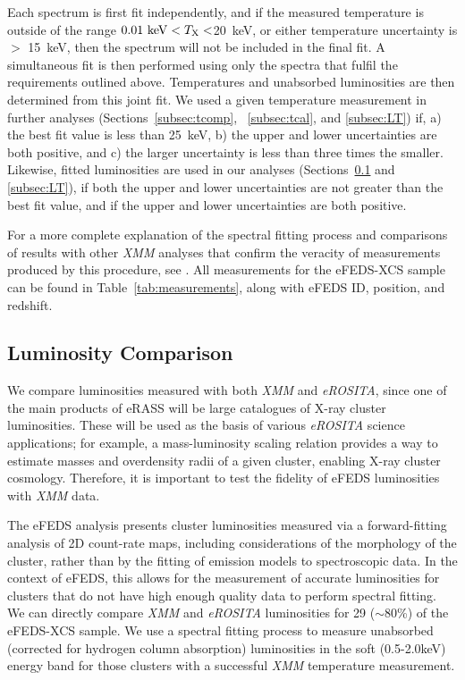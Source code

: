 \documentclass[fleqn,usenatbib]{mnras}
\begin{document}
Each spectrum is first fit independently, and if the measured temperature is outside of the range $0.01~{\rm keV} < T_{\rm{X}} < $20~keV, or either temperature uncertainty is $>$ 15~keV, then the spectrum will not be included in the final fit. A simultaneous fit is then performed using only the spectra that fulfil the requirements outlined above. Temperatures and unabsorbed luminosities are then determined from this joint fit. We used a given temperature measurement in further analyses (Sections~\ref{subsec:tcomp},  ~\ref{subsec:tcal}, and \ref{subsec:LT}) if, a) the best fit value is less than 25~keV, b) the upper and lower uncertainties are both positive, and c) the larger uncertainty is less than three times the smaller. Likewise, fitted luminosities are used in our analyses (Sections~\ref{subsec:lumcomp} and \ref{subsec:LT}), if both the upper and lower uncertainties are not greater than the best fit value, and if the upper and lower uncertainties are both positive. 

For a more complete explanation of the spectral fitting process and comparisons of results with other {\em XMM} analyses that confirm the veracity of measurements produced by this procedure, see \cite{xcsmassmethod}. All measurements for the eFEDS-XCS sample can be found in Table~\ref{tab:measurements}, along with eFEDS ID, position, and redshift.

\subsection{Luminosity Comparison}
\label{subsec:lumcomp}

We compare luminosities measured with both {\em XMM} and {\em eROSITA}, since one of the main products of eRASS will be large catalogues of X-ray cluster luminosities. These will be used as the basis of various {\em eROSITA} science applications; for example, a mass-luminosity scaling relation \citep[such as the one recently produced by][]{efedsmor} provides a way to estimate masses and overdensity radii of a given cluster, enabling X-ray cluster cosmology. Therefore, it is important to test the fidelity of eFEDS luminosities with {\em XMM} data. 

The eFEDS analysis presents cluster luminosities measured via a forward-fitting analysis of 2D count-rate maps, including considerations of the morphology of the cluster, rather than by the fitting of emission models to spectroscopic data. In the context of eFEDS, this allows for the measurement of accurate luminosities for clusters that do not have high enough quality data to perform spectral fitting. We can directly compare {\em XMM} and {\em eROSITA} luminosities for 29 (${\sim}$80\%) of the eFEDS-XCS sample. We use a spectral fitting process to measure unabsorbed (corrected for hydrogen column absorption) luminosities in the soft (0.5-2.0keV) energy band for those clusters with a successful {\em XMM} temperature measurement.
\end{document}
